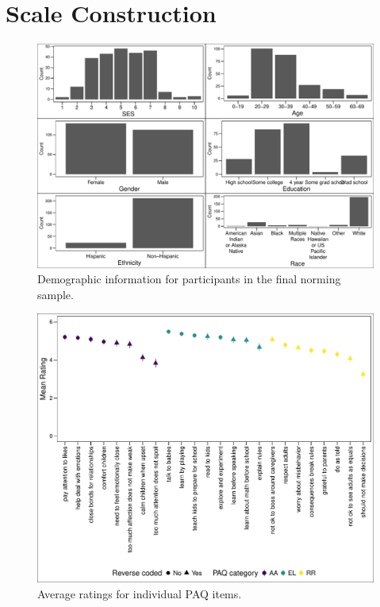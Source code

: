 \documentclass[floatsintext,man]{apa6}
\theoremstyle{definition}
\theoremstyle{definition}
\theoremstyle{definition}
\theoremstyle{remark}
\begin{document}
\section{Scale Construction}\label{scale-construction}

\begin{figure}
\centering
\includegraphics{PAQ_paper_files/figure-latex/normdemo-1.pdf}
\caption{\label{fig:normdemo}Demographic information for participants in the
final norming sample.}
\end{figure}

\begin{figure}
\centering
\includegraphics{PAQ_paper_files/figure-latex/sentratings-1.pdf}
\caption{\label{fig:sentratings}Average ratings for individual PAQ items.}
\end{figure}
\end{document}

